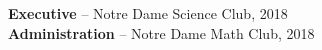 

\textbf{Executive} – Notre Dame Science Club, 2018 \\
\vspace{1mm}
\textbf{Administration} – Notre Dame Math Club, 2018 \\